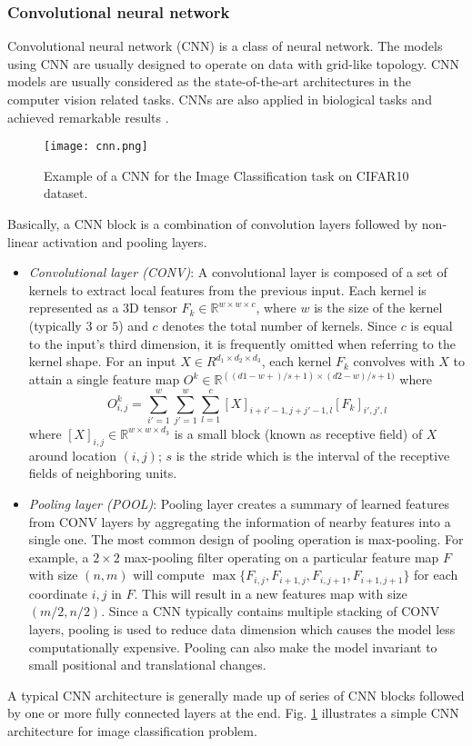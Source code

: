 \documentclass[conference]{IEEEtran}
\begin{document}
\subsubsection{Convolutional neural network}
Convolutional neural network (CNN) \cite{LeCun1998} is a class of neural network. The models using CNN are usually designed to operate on data with grid-like topology. CNN models are usually considered as the state-of-the-art architectures in the computer vision related tasks.
CNNs are also applied in biological tasks and achieved remarkable results \cite{Gawehn2016, Chen2018}. 

\begin{figure}[htbp]
    \centering
    \texttt{[image: cnn.png]}
    \caption{Example of a CNN for the Image Classification task on CIFAR10 dataset.}
    \label{fig:cnn}
\end{figure}

Basically, a CNN block is a combination of convolution layers followed by non-linear activation and pooling layers.
\begin{itemize}
    \item \textit{Convolutional layer (CONV)}: A convolutional layer is composed of a set of kernels to extract local features from the previous input. Each kernel is represented as a 3D tensor $F_k \in \mathbb{R}^{w \times w \times c}$, where $w$ is the size of the kernel (typically $3$ or $5$) and $c$ denotes the total number of kernels. Since $c$ is equal to the input's third dimension, it is frequently omitted when referring to the kernel shape. For an input $X \in R^{d_1 \times d_2 \times d_3}$, each kernel $F_k$ convolves with $X$ to attain a single feature map $O^k \in \mathbb{R}^{((d1-w+)/s+1) \times (d2-w)/s+1)}$ where
    \begin{equation}
        O^k_{i,j} = \sum_{i'=1}^{w}\sum_{j'=1}^{w}\sum_{l=1}^{c}[X]_{i+i'-1,j+j'-1,l}[F_k]_{i',j',l}
    \end{equation}
    where $[X]_{i,j} \in \mathbb{R}^{w\times w\times d_3}$ is a small block (known as receptive field) of $X$ around location $(i,j)$; $s$ is the stride which is the interval of the receptive fields of neighboring units.
    \item \textit{Pooling layer (POOL)}: Pooling layer creates a summary of learned features from CONV layers by aggregating the information of nearby features into a single one. The most common design of pooling operation is max-pooling. For example, a $2 \times 2$ max-pooling filter operating on a particular feature map $F$ with size $(n, m)$ will compute $\max \{F_{i,j}, F_{i+1,j}, F_{i,j+1}, F_{i+1,j+1} \}$ for each coordinate $i, j$ in $F$. This will result in a new features map with size $(m/2, n/2)$. Since a CNN typically contains multiple stacking of CONV layers, pooling is used to reduce data dimension which causes the model less computationally expensive. Pooling can also make the model invariant to small positional and translational changes.
\end{itemize}
A typical CNN architecture is generally made up of series of CNN blocks followed by one or more fully connected layers at the end. Fig. \ref{fig:cnn} illustrates a simple CNN architecture for image classification problem. 
\end{document}

